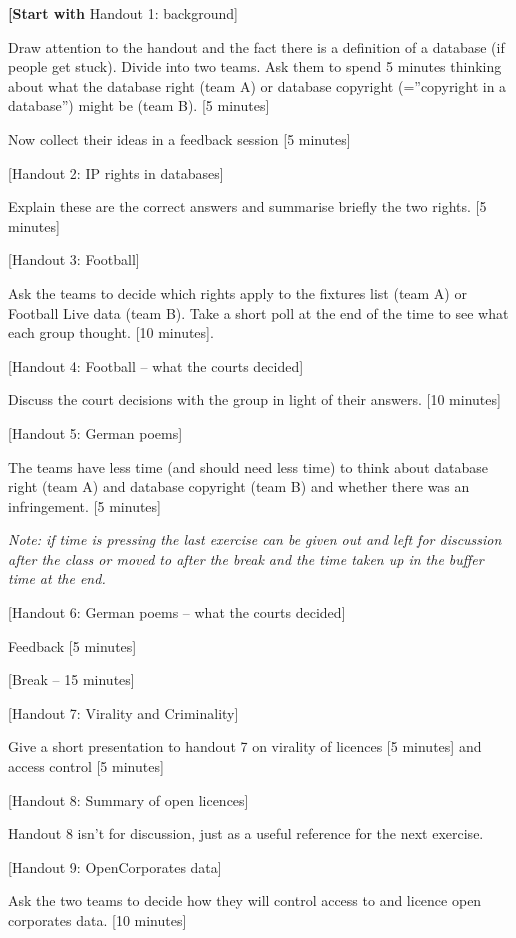 \textbf{{[}Start with} Handout 1: background{]}

Draw attention to the handout and the fact there is a definition of a
database (if people get stuck). Divide into two teams. Ask them to spend
5 minutes thinking about what the database right (team A) or database
copyright (=''copyright in a database'') might be (team B). {[}5
minutes{]}

Now collect their ideas in a feedback session {[}5 minutes{]}

{[}Handout 2: IP rights in databases{]}

Explain these are the correct answers and summarise briefly the two
rights. {[}5 minutes{]}

{[}Handout 3: Football{]}

Ask the teams to decide which rights apply to the fixtures list (team A)
or Football Live data (team B). Take a short poll at the end of the time
to see what each group thought. {[}10 minutes{]}.

{[}Handout 4: Football -- what the courts decided{]}

Discuss the court decisions with the group in light of their answers.
{[}10 minutes{]}

{[}Handout 5: German poems{]}

The teams have less time (and should need less time) to think about
database right (team A) and database copyright (team B) and whether
there was an infringement. {[}5 minutes{]}

\emph{Note: if time is pressing the last exercise can be given out and
left for discussion after the class or moved to after the break and the
time taken up in the buffer time at the end.}

{[}Handout 6: German poems -- what the courts decided{]}

Feedback {[}5 minutes{]}

{[}Break -- 15 minutes{]}

{[}Handout 7: Virality and Criminality{]}

Give a short presentation to handout 7 on virality of licences {[}5
minutes{]} and access control {[}5 minutes{]}

{[}Handout 8: Summary of open licences{]}

Handout 8 isn't for discussion, just as a useful reference for the next
exercise.

{[}Handout 9: OpenCorporates data{]}

Ask the two teams to decide how they will control access to and licence
open corporates data. {[}10 minutes{]}

